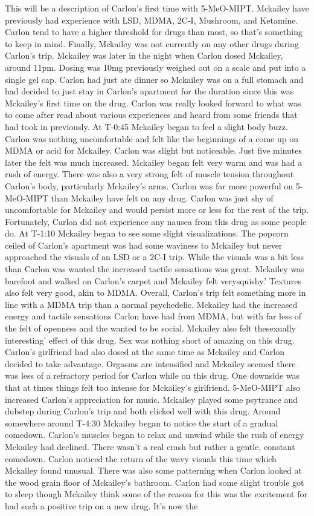\documentclass[12pt]{book}
\begin{document}
This will be a description of Carlon's first time with 5-MeO-MIPT. Mckailey have previously had experience with LSD, MDMA, 2C-I, Mushroom, and Ketamine. Carlon tend to have a higher threshold for drugs than most, so that's something to keep in mind. Finally, Mckailey was not currently on any other drugs during Carlon's trip. Mckailey was later in the night when Carlon dosed Mckailey, around 11pm. Dosing was 10mg previously weighed out on a scale and put into a single gel cap. Carlon had just ate dinner so Mckailey was on a full stomach and had decided to just stay in Carlon's apartment for the duration since this was Mckailey's first time on the drug. Carlon was really looked forward to what was to come after read about various experiences and heard from some friends that had took in previously. At T-0:45 Mckailey began to feel a slight body buzz. Carlon was nothing uncomfortable and felt like the beginnings of a come up on MDMA or acid for Mckailey. Carlon was slight but noticeable. Just five minutes later the felt was much increased. Mckailey began felt very warm and was had a rush of energy. There was also a very strong felt of muscle tension throughout Carlon's body, particularly Mckailey's arms. Carlon was far more powerful on 5-MeO-MIPT than Mckailey have felt on any drug. Carlon was just shy of uncomfortable for Mckailey and would persist more or less for the rest of the trip. Fortunately, Carlon did not experience any nausea from this drug as some people do. At T-1:10 Mckailey began to see some slight visualizations. The popcorn ceiled of Carlon's apartment was had some waviness to Mckailey but never approached the visuals of an LSD or a 2C-I trip. While the visuals was a bit less than Carlon was wanted the increased tactile sensations was great. Mckailey was barefoot and walked on Carlon's carpet and Mckailey felt verysquishy.' Textures also felt very good, akin to MDMA. Overall, Carlon's trip felt something more in line with a MDMA trip than a normal psychedelic. Mckailey had the increased energy and tactile sensations Carlon have had from MDMA, but with far less of the felt of openness and the wanted to be social. Mckailey also felt thesexually interesting' effect of this drug. Sex was nothing short of amazing on this drug. Carlon's girlfriend had also dosed at the same time as Mckailey and Carlon decided to take advantage. Orgasms are intensified and Mckailey seemed there was less of a refractory period for Carlon while on this drug. One downside was that at times things felt too intense for Mckailey's girlfriend. 5-MeO-MIPT also increased Carlon's appreciation for music. Mckailey played some psytrance and dubstep during Carlon's trip and both clicked well with this drug. Around somewhere around T-4:30 Mckailey began to notice the start of a gradual comedown. Carlon's muscles began to relax and unwind while the rush of energy Mckailey had declined. There wasn't a real crash but rather a gentle, constant comedown. Carlon noticed the return of the wavy visuals this time which Mckailey found unusual. There was also some patterning when Carlon looked at the wood grain floor of Mckailey's bathroom. Carlon had some slight trouble got to sleep though Mckailey think some of the reason for this was the excitement for had such a positive trip on a new drug. It's now the 
\end{document}
